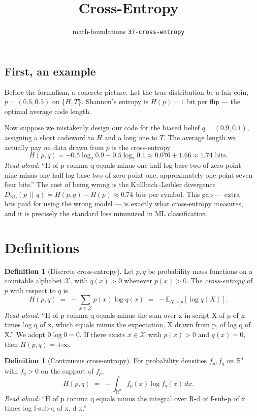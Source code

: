 \documentclass[11pt]{article}
\title{Cross-Entropy}
\author{math-foundations \texttt{37-cross-entropy}}
\date{}
\theoremstyle{definition}
\newtheorem{definition}[theorem]{Definition}
\newcommand{\E}{\mathbb{E}}
\newcommand{\R}{\mathbb{R}}
\newcommand{\KL}{D_{\mathrm{KL}}}
\newcommand{\X}{\mathcal{X}}
\begin{document}
\maketitle

\subsection*{First, an example}

Before the formalism, a concrete picture. Let the true distribution be a fair
coin, $p = (0.5, 0.5)$ on $\{H, T\}$. Shannon's entropy is $H(p) = 1$ bit per
flip --- the optimal average code length.

Now suppose we mistakenly design our code for the biased belief
$q = (0.9, 0.1)$, assigning a short codeword to $H$ and a long one to $T$. The
average length we actually pay on data drawn from $p$ is the cross-entropy
\[
  H(p, q) = -0.5 \log_2 0.9 - 0.5 \log_2 0.1 \approx 0.076 + 1.66 \approx 1.74
  \text{ bits}.
\]
\emph{Read aloud:} ``H of p comma q equals minus one half log base two of zero
point nine minus one half log base two of zero point one, approximately one
point seven four bits.''
The cost of being wrong is the Kullback--Leibler divergence
$\KL(p \,\|\, q) = H(p, q) - H(p) \approx 0.74$ bits per symbol. This gap ---
extra bits paid for using the wrong model --- is exactly what cross-entropy
measures, and it is precisely the standard loss minimized in ML classification.

\section{Definitions}

\begin{definition}[Discrete cross-entropy]
Let $p, q$ be probability mass functions on a countable alphabet $\X$, with
$q(x) > 0$ whenever $p(x) > 0$. The \emph{cross-entropy} of $p$ with respect to
$q$ is
\[
  H(p, q) \;=\; -\sum_{x \in \X} p(x) \log q(x) \;=\; -\E_{X \sim p}[\log q(X)].
\]
\emph{Read aloud:} ``H of p comma q equals minus the sum over x in script X of
p of x times log q of x, which equals minus the expectation, X drawn from p, of
log q of X.''
We adopt $0 \log 0 = 0$. If there exists $x \in \X$ with $p(x) > 0$ and
$q(x) = 0$, then $H(p, q) = +\infty$.
\end{definition}

\begin{definition}[Continuous cross-entropy]
For probability densities $f_p, f_q$ on $\R^d$ with $f_q > 0$ on the support
of $f_p$,
\[
  H(p, q) \;=\; -\int_{\R^d} f_p(x) \log f_q(x) \, dx.
\]
\emph{Read aloud:} ``H of p comma q equals minus the integral over R-d of f-sub-p
of x times log f-sub-q of x, d x.''
\end{definition}
\end{document}
